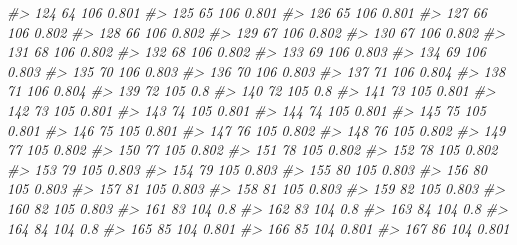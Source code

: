 \documentclass[
]{book}
\newenvironment{Shaded}{\begin{snugshade}}{\end{snugshade}}
\newcommand{\CommentTok}[1]{\textcolor[rgb]{0.56,0.35,0.01}{\textit{#1}}}
\begin{document}
\begin{Shaded}
\begin{Highlighting}[]
\CommentTok{\#\textgreater{} 124         64      106 0.801}
\CommentTok{\#\textgreater{} 125         65      106 0.801}
\CommentTok{\#\textgreater{} 126         65      106 0.801}
\CommentTok{\#\textgreater{} 127         66      106 0.802}
\CommentTok{\#\textgreater{} 128         66      106 0.802}
\CommentTok{\#\textgreater{} 129         67      106 0.802}
\CommentTok{\#\textgreater{} 130         67      106 0.802}
\CommentTok{\#\textgreater{} 131         68      106 0.802}
\CommentTok{\#\textgreater{} 132         68      106 0.802}
\CommentTok{\#\textgreater{} 133         69      106 0.803}
\CommentTok{\#\textgreater{} 134         69      106 0.803}
\CommentTok{\#\textgreater{} 135         70      106 0.803}
\CommentTok{\#\textgreater{} 136         70      106 0.803}
\CommentTok{\#\textgreater{} 137         71      106 0.804}
\CommentTok{\#\textgreater{} 138         71      106 0.804}
\CommentTok{\#\textgreater{} 139         72      105   0.8}
\CommentTok{\#\textgreater{} 140         72      105   0.8}
\CommentTok{\#\textgreater{} 141         73      105 0.801}
\CommentTok{\#\textgreater{} 142         73      105 0.801}
\CommentTok{\#\textgreater{} 143         74      105 0.801}
\CommentTok{\#\textgreater{} 144         74      105 0.801}
\CommentTok{\#\textgreater{} 145         75      105 0.801}
\CommentTok{\#\textgreater{} 146         75      105 0.801}
\CommentTok{\#\textgreater{} 147         76      105 0.802}
\CommentTok{\#\textgreater{} 148         76      105 0.802}
\CommentTok{\#\textgreater{} 149         77      105 0.802}
\CommentTok{\#\textgreater{} 150         77      105 0.802}
\CommentTok{\#\textgreater{} 151         78      105 0.802}
\CommentTok{\#\textgreater{} 152         78      105 0.802}
\CommentTok{\#\textgreater{} 153         79      105 0.803}
\CommentTok{\#\textgreater{} 154         79      105 0.803}
\CommentTok{\#\textgreater{} 155         80      105 0.803}
\CommentTok{\#\textgreater{} 156         80      105 0.803}
\CommentTok{\#\textgreater{} 157         81      105 0.803}
\CommentTok{\#\textgreater{} 158         81      105 0.803}
\CommentTok{\#\textgreater{} 159         82      105 0.803}
\CommentTok{\#\textgreater{} 160         82      105 0.803}
\CommentTok{\#\textgreater{} 161         83      104   0.8}
\CommentTok{\#\textgreater{} 162         83      104   0.8}
\CommentTok{\#\textgreater{} 163         84      104   0.8}
\CommentTok{\#\textgreater{} 164         84      104   0.8}
\CommentTok{\#\textgreater{} 165         85      104 0.801}
\CommentTok{\#\textgreater{} 166         85      104 0.801}
\CommentTok{\#\textgreater{} 167         86      104 0.801}

\end{Highlighting}
\end{Shaded}
\end{document}
